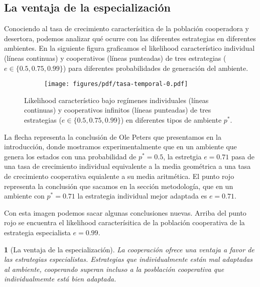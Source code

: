 \documentclass[a4paper,10pt]{article}
\newif\ifen
\newif\ifes
\newcommand{\en}[1]{\ifen#1\fi}
\newcommand{\es}[1]{\ifes#1\fi}
\newtheorem{conclution}{\en{Conclution}\es{Conclusión}}%
\begin{document}
\subsection{La ventaja de la especialización}

Conociendo al tasa de crecimiento caracterísitica de la población cooperadora y desertora, podemos analizar qué ocurre con las diferentes estrategias en diferentes ambientes.
En la siguiente figura graficamos el likelihood característico individual (líneas continuas) y cooperativos (líneas punteadas) de tres estrategias ($e \in \{0.5, 0.75, 0.99\}$) para diferentes probabilidades de generación del ambiente.
%
\begin{figure}[H]
    \centering
    \begin{subfigure}[b]{0.66\textwidth}
    \texttt{[image: figures/pdf/tasa-temporal-0.pdf]}
    \end{subfigure}
    \caption{Likelihood característico bajo regímenes individuales (líneas continuas) y cooperativos infinitos (líneas punteadas) de tres estrategias ($e \in \{0.5, 0.75, 0.99\}$) en diferentes tipos de ambiente $p^*$.}
    \label{fig:fitness_temporal}
\end{figure}
%
La flecha representa la conclusión de Ole Peters que presentamos en la introducción, donde mostramos experimentalmente que en un ambiente que genera los estados con una probabilidad de $p^* = 0.5$, la estretgia $e=0.71$ pasa de una tasa de crecimiento individual equivalente a la media geométrica a una tasa de crecimiento cooperativa equialente a su media aritmética.
El punto rojo representa la conclusión que sacamos en la sección metodología, que en un ambiente con $p^*=0.71$ la estrategia individual mejor adaptada es $e=0.71$.


Con esta imagen podemos sacar algunas conclusiones nuevas.
Arriba del punto rojo se encuentra el likelihood caracterísitica de la población cooperativa de la estrategia especialista $e=0.99$.

\begin{conclution}[La ventaja de la especialización]
La cooperación ofrece una ventaja a favor de las estrategias especialistas. Estrategias que individualmente están mal adaptadas al ambiente, cooperando superan incluso a la posblación cooperativa que individualmemte está bien adaptada.
\end{conclution}
\end{document}
